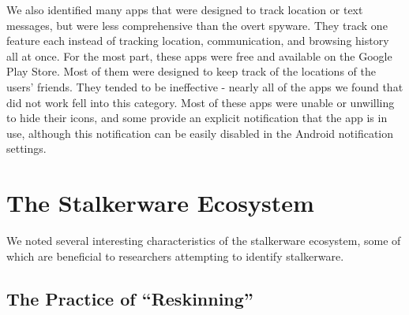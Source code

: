 \documentclass[acmtog]{acmart}
\begin{document}
We also identified many apps that were designed to track location or text 
messages, but were less comprehensive than the overt spyware. They 
track one feature each instead of tracking location, communication, and 
browsing history all at once. For the most part, these apps were free and 
available on the Google Play Store. Most of them were designed to keep track 
of the locations of the users' friends. They tended to be ineffective - nearly 
all of the apps we found that did not work fell into this category. Most of 
these apps were unable or unwilling to hide their icons, and some provide an 
explicit notification that the app is in use, although this notification can be 
easily disabled in the Android notification settings. 

\section{The Stalkerware Ecosystem}

We noted several interesting characteristics of the stalkerware ecosystem, some 
of which are beneficial to researchers attempting to identify stalkerware.

\subsection{The Practice of ``Reskinning''}
\label{reskinning}
\end{document}

